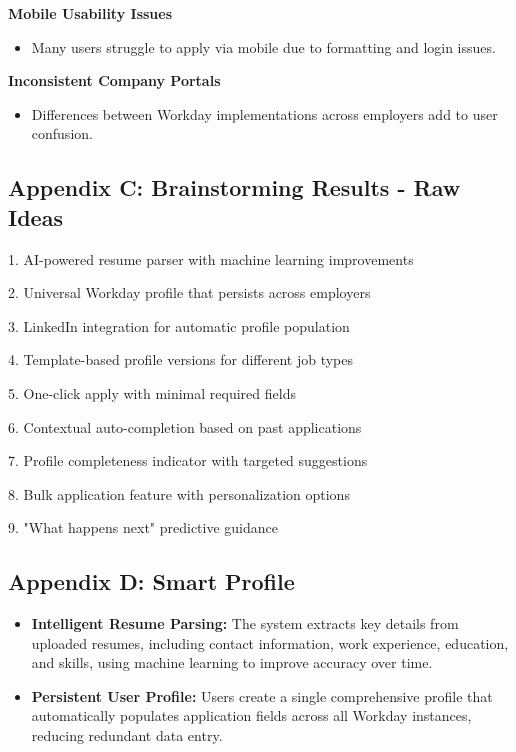\documentclass[
	letterpaper, %
]{jdf}
\begin{document}
\begin{sloppypar}
\textbf{Mobile Usability Issues}  
\begin{itemize}  
    \item Many users struggle to apply via mobile due to formatting and login issues.  
\end{itemize}  

\textbf{Inconsistent Company Portals}  
\begin{itemize}  
    \item Differences between Workday implementations across employers add to user confusion.  
\end{itemize}  


\subsection{Appendix C: Brainstorming Results - Raw Ideas}

1. AI-powered resume parser with machine learning improvements

2. Universal Workday profile that persists across employers

3. LinkedIn integration for automatic profile population

4. Template-based profile versions for different job types

5. One-click apply with minimal required fields

6. Contextual auto-completion based on past applications

7. Profile completeness indicator with targeted suggestions

8. Bulk application feature with personalization options

9. "What happens next" predictive guidance

\hfill \break
\subsection{Appendix D: Smart Profile}
 
\begin{itemize}
    \item \textbf{Intelligent Resume Parsing:} The system extracts key details from uploaded resumes, including contact information, work experience, education, and skills, using machine learning to improve accuracy over time.
    
    \item \textbf{Persistent User Profile:} Users create a single comprehensive profile that automatically populates application fields across all Workday instances, reducing redundant data entry.
    

\end{itemize}
\end{sloppypar}
\end{document}
